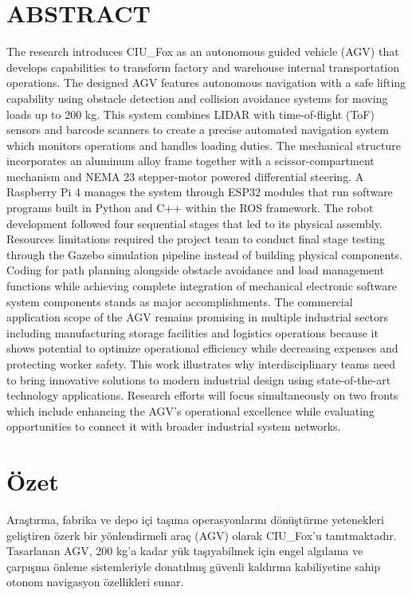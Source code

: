 \documentclass[main]{subfiles}
\begin{document}
\chapter*{\hfil ABSTRACT \hfil}
\justifying
The research introduces CIU\_Fox as an autonomous guided vehicle (AGV) that develops capabilities to transform factory and warehouse internal transportation operations. The designed AGV features autonomous navigation with a safe lifting capability using obstacle detection and collision avoidance systems for moving loads up to 200 kg.
This system combines LIDAR with time-of-flight (ToF) sensors and barcode scanners to create a precise automated navigation system which monitors operations and handles loading duties.
The mechanical structure incorporates an aluminum alloy frame together with a scissor-compartment mechanism and NEMA 23 stepper-motor powered differential steering.
A Raspberry Pi 4 manages the system through ESP32 modules that run software programs built in Python and C++ within the ROS framework.
The robot development followed four sequential stages that led to its physical assembly. Resources limitations required the project team to conduct final stage testing through the Gazebo simulation pipeline instead of building physical components. Coding for path planning alongside obstacle avoidance and load management functions while achieving complete integration of mechanical electronic software system components stands as major accomplishments. The commercial application scope of the AGV remains promising in multiple industrial sectors including manufacturing storage facilities and logistics operations because it shows potential to optimize operational efficiency while decreasing expenses and protecting worker safety.  
This work illustrates why interdisciplinary teams need to bring innovative solutions to modern industrial design using state-of-the-art technology applications. Research efforts will focus simultaneously on two fronts which include enhancing the AGV's operational excellence while evaluating opportunities to connect it with broader industrial system networks.

\newpage
\centering
\chapter*{\hfil Özet \hfil}
\justifying
Araştırma, fabrika ve depo içi taşıma operasyonlarını dönüştürme yetenekleri geliştiren özerk bir yönlendirmeli araç (AGV) olarak CIU\_Fox'u tanıtmaktadır. 
Tasarlanan AGV, 200 kg'a kadar yük taşıyabilmek için engel algılama ve çarpışma önleme sistemleriyle donatılmış güvenli kaldırma kabiliyetine sahip otonom navigasyon özellikleri sunar.
\end{document}
